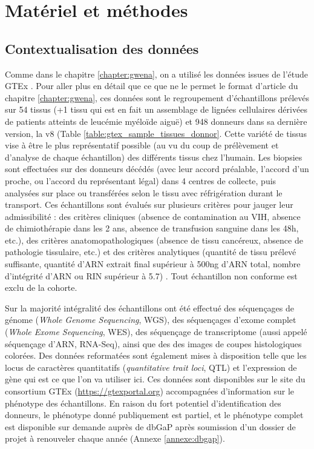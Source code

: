 \section{Matériel et méthodes}

\subsection{Contextualisation des données}

Comme dans le chapitre \ref{chapter:gwena}, on a utilisé les données issues de l'étude GTEx \cite{Ardlie2015}. Pour aller plus en détail que ce que ne le permet le format d'article du chapitre \ref{chapter:gwena}, ces données sont le regroupement d'échantillons prélevés sur 54 tissus (+1 tissu qui est en fait un assemblage de lignées cellulaires dérivées de patients atteints de leucémie myéloïde aiguë\cite{Way2020}) et 948 donneurs dans sa dernière version, la v8 (Table \ref{table:gtex_sample_tissues_donnor}. Cette variété de tissus vise à être le plus représentatif possible (au vu du coup de prélèvement et d'analyse de chaque échantillon) des différents tissus chez l'humain. Les biopsies sont effectuées sur des donneurs décédés (avec leur accord préalable, l'accord d'un proche, ou l'accord du représentant légal) dans 4 centres de collecte, puis analysées sur place ou transférées selon le tissu avec réfrigération durant le transport. Ces échantillons sont évalués sur plusieurs critères pour jauger leur admissibilité : des critères cliniques (absence de contamination au VIH, absence de chimiothérapie dans les 2 ans, absence de transfusion sanguine dans les 48h, etc.), des critères anatomopathologiques (absence de tissu cancéreux, absence de pathologie tissulaire, etc.) et des critères analytiques (quantité de tissu prélevé suffisante, quantité d'ARN extrait final supérieur à 500ng d'ARN total, nombre d'intégrité d'ARN ou RIN supérieur à 5.7) \cite{Carithers2015}. Tout échantillon non conforme est exclu de la cohorte.

Sur la majorité intégralité des échantillons ont été effectué des séquençages de génome (\textit{Whole Genome Sequencing}, WGS), des séquençages d'exome complet (\textit{Whole Exome Sequencing}, WES), des séquençage de transcriptome (aussi appelé séquençage d'ARN, RNA-Seq), ainsi que des des images de coupes histologiques colorées. Des données reformatées sont également mises à disposition telle que les locus de caractères quantitatifs (\textit{quantitative trait loci}, QTL) et l'expression de gène qui est ce que l'on va utiliser ici. Ces données sont disponibles sur le site du consortium GTEx (\url{https://gtexportal.org}) accompagnées d'information sur le phénotype des échantillons. En raison du fort potentiel d'identification des donneurs, le phénotype donné publiquement est partiel, et le phénotype complet est disponible sur demande auprès de dbGaP après soumission d'un dossier de projet à renouveler chaque année (Annexe \ref{annexe:dbgap}).

